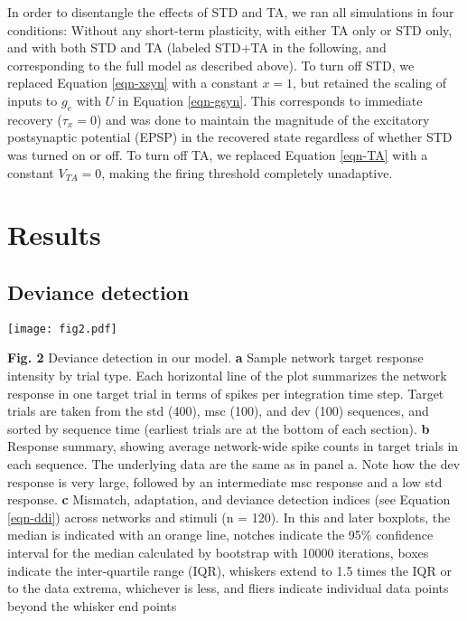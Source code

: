 \documentclass[pdflatex,referee,iicol,sn-basic]{sn-jnl}
\theoremstyle{thmstyleone}%
\theoremstyle{thmstyletwo}%
\theoremstyle{thmstylethree}%
\begin{document}
In order to disentangle the effects of STD and TA, we ran all simulations in four conditions: Without any short-term plasticity, with either TA only or STD only, and with both STD and TA (labeled STD+TA in the following, and corresponding to the full model as described above). To turn off STD, we replaced Equation \ref{eqn-xsyn} with a constant $x = 1$, but retained the scaling of inputs to $g_e$ with $U$ in Equation \ref{eqn-gsyn}. This corresponds to immediate recovery ($\tau_x = 0$) and was done to maintain the magnitude of the excitatory postsynaptic potential (EPSP) in the recovered state regardless of whether STD was turned on or off. To turn off TA, we replaced Equation \ref{eqn-TA} with a constant $V_{TA} = 0$, making the firing threshold completely unadaptive.

\section{Results}\label{sec-results}

\subsection{Deviance detection}\label{sec-dd}

\begin{figure*}%
    \centering
    \texttt{[image: fig2.pdf]}
    \caption{}
    \label{fig2}
\end{figure*}
\textbf{Fig. 2} Deviance detection in our model. \textbf{a} Sample network target response intensity by trial type. Each horizontal line of the plot summarizes the network response in one target trial in terms of spikes per integration time step. Target trials are taken from the std (400), msc (100), and dev (100) sequences, and sorted by sequence time (earliest trials are at the bottom of each section). \textbf{b} Response summary, showing average network-wide spike counts in target trials in each sequence. The underlying data are the same as in panel a. Note how the dev response is very large, followed by an intermediate msc response and a low std response. \textbf{c} Mismatch, adaptation, and deviance detection indices (see Equation \ref{eqn-ddi}) across networks and stimuli (n = 120). In this and later boxplots, the median is indicated with an orange line, notches indicate the 95\% confidence interval for the median calculated by bootstrap with 10000 iterations, boxes indicate the inter-quartile range (IQR), whiskers extend to 1.5 times the IQR or to the data extrema, whichever is less, and fliers indicate individual data points beyond the whisker end points
\end{document}
